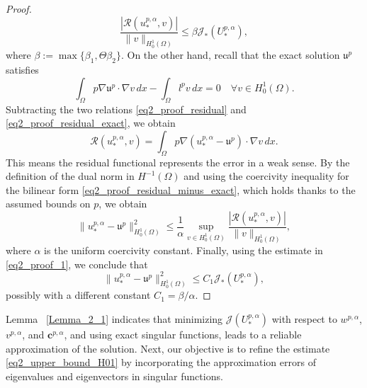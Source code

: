 \documentclass[oneside]{article}
\begin{document}
\begin{proof}
\begin{equation}\label{eq2_proof_1}
    \frac{|\mathcal{R}(u^{p, \alpha}_*, v)|}{\|v\|_{H_0^1(\Omega)}} \leq 
    \beta {\mathcal{J}}_*(U_*^{p, \alpha}),
\end{equation}
where $\beta := \max\{\beta_1, \Theta \beta_2\}$.  On the other hand, recall that the exact solution $\mathfrak{u}^p$ satisfies
\begin{equation}\label{eq2_proof_residual_exact}
\int_\Omega p \nabla \mathfrak{u}^p \cdot \nabla v \, dx - \int_\Omega l^p v \, dx = 0 \quad \forall v \in H_0^1(\Omega).
\end{equation}
Subtracting the two relations \eqref{eq2_proof_residual} and \eqref{eq2_proof_residual_exact}, we obtain
\begin{equation}\label{eq2_proof_residual_minus_exact}
\mathcal{R}(u^{p, \alpha}_*, v) = \int_\Omega p \nabla (u^{p, \alpha}_* - \mathfrak{u}^p) \cdot \nabla v \, dx.
\end{equation}
This means the residual functional represents the error in a weak sense. By the definition of the dual norm in $H^{-1}(\Omega)$ and using the coercivity inequality for the bilinear form \eqref{eq2_proof_residual_minus_exact}, which holds thanks to the assumed bounds on $p$, we obtain
\begin{equation}
\|u^{p, \alpha}_* - \mathfrak{u}^p\|^2_{H_0^1(\Omega)} \leq \frac{1}{\alpha} \sup_{v \in H_0^1(\Omega)} \frac{|\mathcal{R}(u^{p, \alpha}_*, v)|}{\|v\|_{H_0^1(\Omega)}},
\end{equation}
where $\alpha$ is the uniform coercivity constant. Finally, using the estimate in \eqref{eq2_proof_1}, we conclude that
\begin{equation}
 \|u^{p, \alpha}_* - \mathfrak{u}^p\|_{H_0^1(\Omega)}^2  \leq C_1 {\mathcal{J}}_*(U_*^{p, \alpha}),
\end{equation}
possibly with a different constant $C_1 = \beta/\alpha$.
\end{proof}
\noindent
Lemma ~\ref{Lemma_2_1} indicates that minimizing \( {\mathcal{J}}(U_*^{p, \alpha})\) with respect to \( w^{p, \alpha} \), \( v^{p, \alpha} \), and \( \mathbf{c}^{p, \alpha} \), and using exact singular functions, leads to a reliable approximation of the solution. Next, our objective is to refine the estimate \eqref{eq2_upper_bound_H01} by incorporating the approximation errors of eigenvalues and eigenvectors in singular functions.
\end{document}
